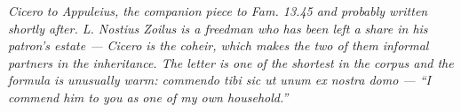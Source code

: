 
\textit{Cicero to Appuleius, the companion piece to \textit{Fam.}
13.45 and probably written shortly after. L. Nostius Zoilus is a
freedman who has been left a share in his patron's estate ---
Cicero is the coheir, which makes the two of them informal partners
in the inheritance. The letter is one of the shortest in the corpus
and the formula is unusually warm: \textit{commendo tibi sic ut unum
ex nostra domo} --- ``I commend him to you as one of my own
household.''}
